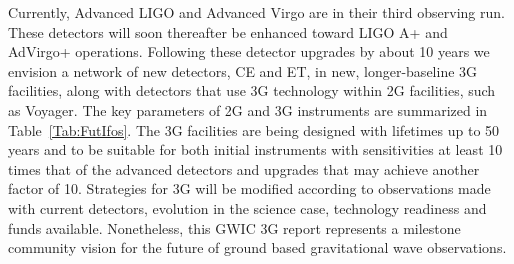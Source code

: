 Currently, Advanced LIGO and Advanced Virgo are in their third observing run. These detectors will soon thereafter be enhanced toward LIGO A+ and AdVirgo+ operations. Following these detector upgrades by about 10 years we envision a network of new detectors, CE and ET, in new, longer-baseline \ac{3G} facilities, along with detectors that use \ac{3G} technology within \ac{2G} facilities, such as Voyager.
The key parameters of \ac{2G} and \ac{3G} instruments are summarized in Table~\ref{Tab:FutIfos}.
The \ac{3G} facilities are being designed with lifetimes up to 50 years and to be suitable for both initial instruments with sensitivities at least 10 times that of the advanced detectors and upgrades that may achieve another factor of 10.
Strategies for \ac{3G} will be modified according to observations made with current detectors, evolution in the science case, technology readiness and funds available. Nonetheless, this \ac{GWIC} \ac{3G} report represents a milestone community vision for the future of ground based gravitational wave observations. 






